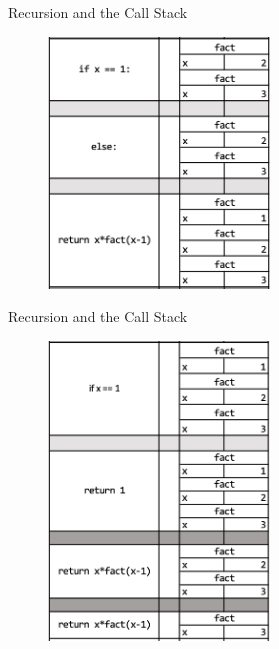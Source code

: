 \documentclass[
  ignorenonframetext,
]{beamer}
\begin{document}
\begin{frame}{Recursion and the Call Stack}
\protect\hypertarget{recursion-and-the-call-stack-1}{}
\begin{figure}

{\centering \includegraphics[width=5.9cm,height=\textheight]{images/rec-call-2.png}

}

\end{figure}
\end{frame}

\begin{frame}{Recursion and the Call Stack}
\protect\hypertarget{recursion-and-the-call-stack-2}{}
\begin{figure}

{\centering \includegraphics[width=5.9cm,height=\textheight]{images/rec-call-3.png}

}

\end{figure}
\end{frame}
\end{document}
